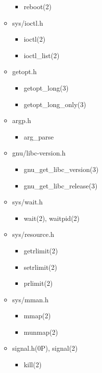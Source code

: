 \documentclass{article}
\begin{document}
\begin{itemize}
\begin{itemize}
\begin{itemize}
                    \item reboot(2)
                \end{itemize}
            \item sys/ioctl.h
                \begin{itemize}
                    \item ioctl(2)
                    \item ioctl_list(2)
                \end{itemize}
            \item getopt.h
                \begin{itemize}
                    \item getopt_long(3)
                    \item getopt_long_only(3)
                \end{itemize}
            \item argp.h
                \begin{itemize}
                    \item arg_parse
                \end{itemize}
            \item gnu/libc-version.h
                \begin{itemize}
                    \item gnu_get_libc_version(3)
                    \item gnu_get_libc_release(3)
                \end{itemize}
            \item sys/wait.h
                \begin{itemize}
                    \item wait(2), waitpid(2)
                \end{itemize}
            \item sys/resource.h
                \begin{itemize}
                    \item getrlimit(2)
                    \item setrlimit(2)
                    \item prlimit(2)
                \end{itemize}
            \item sys/mman.h
                \begin{itemize}
                    \item mmap(2)
                    \item munmap(2)
                \end{itemize}
            \item signal.h(0P), signal(2)
                \begin{itemize}
                    \item kill(2)


\end{itemize}
\end{itemize}
\end{itemize}
\end{document}
